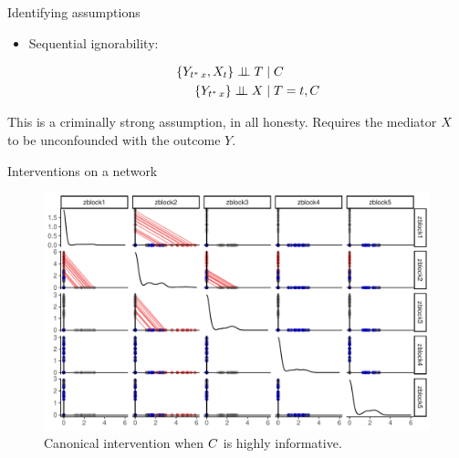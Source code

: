 \documentclass{beamer}
\theoremstyle{remark}
\begin{document}
\begin{frame}{Identifying assumptions}

    \begin{itemize}

        \item Sequential ignorability:

              \begin{equation*}
                  \begin{aligned}
                      \{Y_{t^* \, x}, X_t\} \perp \!\!\! \perp T & \mid C        \\
                      \{Y_{t^* \, x}\} \perp \!\!\! \perp X      & \mid T = t, C
                  \end{aligned}
              \end{equation*}

    \end{itemize}

    This is a criminally strong assumption, in all honesty. Requires the mediator $X$ to be unconfounded with the outcome $Y$.

\end{frame}


\begin{frame}{Interventions on a network}

    \begin{figure}
        \includegraphics[width=\textwidth]{figures/intervention.pdf}
        \caption{Canonical intervention when $C$ is highly informative.}
        \label{fig:intervention}
    \end{figure}
\end{frame}
\end{document}
